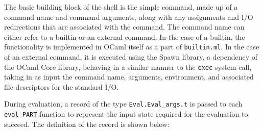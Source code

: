 \documentclass[oneside]{report}
\begin{document}






The basic building block of the shell is the simple command, made up of a command name and command arguments, along with any assignments and I/O redirections that are associated with the command.
The command name can either refer to a builtin or an external command.
In the case of a builtin, the functionality is implemented in OCaml itself as a part of \texttt{builtin.ml}.
In the case of an external command, it is executed using the Spawn library, a dependency of the OCaml Core library, behaving in a similar manner to the \texttt{exec} system call, taking in as input the command name, arguments, environment, and associated file descriptors for the standard I/O.

During evaluation, a record of the type \texttt{Eval.Eval\_args.t} is passed to each \texttt{eval\_PART} function to represent the input state required for the evaluation to succeed. The definition of the record is shown below:
\end{document}
